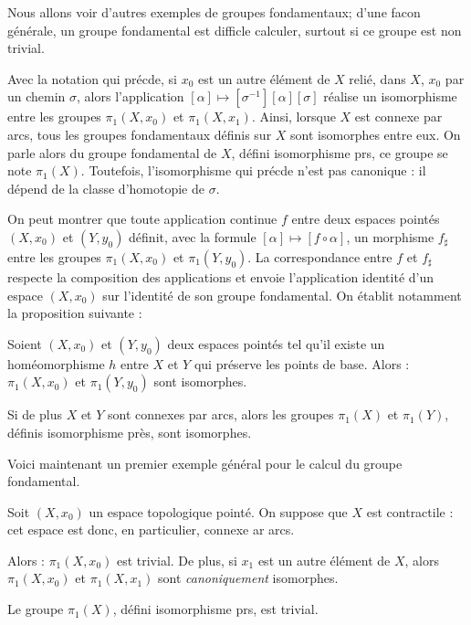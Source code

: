 Nous allons voir d'autres exemples de groupes fondamentaux; d'une facon g\'en\'erale, un groupe fondamental est difficle  calculer, surtout si ce groupe est non trivial.

Avec la notation qui pr\'ecde, si $x_0$ est un autre \'el\'ement de $X$ reli\'e, dans $X$,  $x_0$ par un chemin $\sigma$, %
alors l'application $[\alpha]\mapsto [\sigma^{-1}][\alpha][\sigma]$ r\'ealise un isomorphisme entre les groupes $\pi_1(X,x_0)$ et $\pi_1(X,x_1)$. %
Ainsi, lorsque $X$ est connexe par arcs, tous les groupes fondamentaux d\'efinis sur $X$ sont isomorphes entre eux. %
On parle alors du groupe fondamental de $X$, d\'efini  isomorphisme prs, ce groupe se note $\pi_1(X)$. %
Toutefois, l'isomorphisme qui pr\'ecde n'est pas canonique : il d\'epend de la classe d'homotopie de $\sigma$.

\etoile

On peut montrer que toute application continue $f$ entre deux espaces point\'es $(X,x_0)$ et $(Y,y_0)$ d\'efinit, %
avec la formule $[\alpha]\mapsto [f\circ\alpha]$, un morphisme $f_{\sharp}$ entre les groupes $\pi_1 (X,x_0)$ et $\pi_1 (Y,y_0)$. %
La correspondance entre $f$ et $f_{\sharp}$ respecte la composition des applications et envoie l'application identit\'e d'un espace $(X,x_0)$ sur l'identit\'e de son groupe fondamental. %
On \'etablit notamment la proposition suivante :

\begin{prop}
Soient $(X,x_0)$ et $(Y,y_0)$ deux espaces point\'es tel qu'il existe un hom\'eomorphisme $h$ entre $X$ et $Y$ qui pr\'eserve les points de base. %
Alors : $\pi_1(X,x_0)$ et $\pi_1(Y,y_0)$ sont isomorphes.

Si de plus $X$ et $Y$ sont connexes par arcs, alors les groupes $\pi_1 (X)$ et $\pi_1 (Y)$, d\'efinis  isomorphisme pr\`es, sont isomorphes.
\end{prop}

\etoile

Voici maintenant un premier exemple g\'en\'eral pour le calcul du groupe fondamental.

\begin{theo}
Soit $(X,x_0)$ un espace topologique point\'e. On suppose que $X$ est contractile : cet espace est donc, en particulier, connexe ar arcs.

Alors : $\pi_1(X,x_0)$ est trivial. De plus, si $x_1$ est un autre \'el\'ement de $X$, alors $\pi_1(X,x_0)$ et $\pi_1(X,x_1)$ sont \textit{canoniquement} isomorphes.

Le groupe $\pi_1(X)$, d\'efini  isomorphisme prs, est trivial.
\end{theo}

